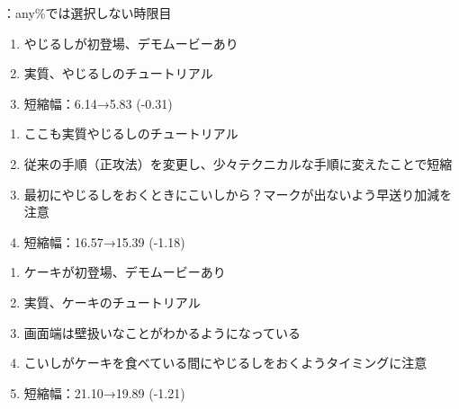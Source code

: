 

%

{\TBW}：any\%では選択しない時限目



\begin{enumerate}[label={\sarrow}]
\item やじるしが初登場、デモムービーあり
\item 実質、やじるしのチュートリアル
\item 短縮幅：6.14→5.83 (-0.31)
\end{enumerate}



\begin{enumerate}[label={\sarrow}]
\item ここも実質やじるしのチュートリアル
\item 従来の手順（正攻法）を変更し、少々テクニカルな手順に変えたことで短縮
\item 最初にやじるしをおくときにこいしから？\hspace{0pt}マークが出ないよう早送り加減を注意
\item 短縮幅：16.57→15.39 (-1.18)
\end{enumerate}



\begin{enumerate}[label={\sarrow}]
\item ケーキが初登場、デモムービーあり
\item 実質、ケーキのチュートリアル
\item 画面端は壁扱いなことがわかるようになっている
\item こいしがケーキを食べている間にやじるしをおくようタイミングに注意
\item 短縮幅：21.10→19.89 (-1.21)
\end{enumerate}



